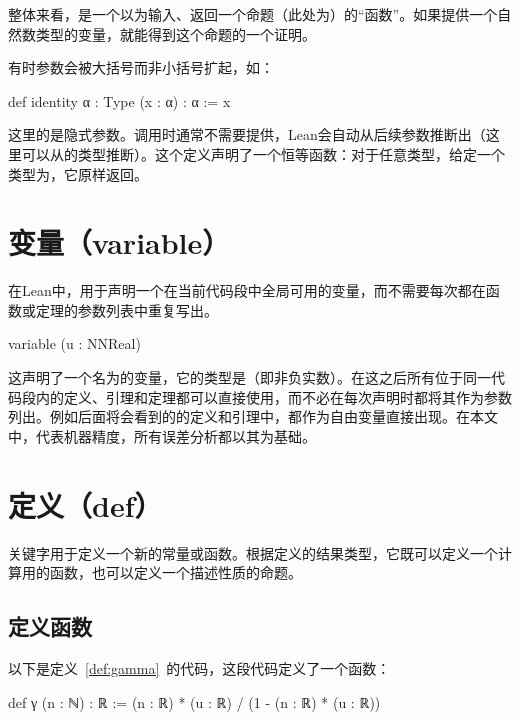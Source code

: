 ﻿\documentclass[UTF8,a4paper,openany]{ctexbook}
\theoremstyle{qrplain}
\begin{document}
整体来看，是一个以为输入、返回一个命题（此处为）的“函数”。如果提供一个自然数类型的变量，就能得到这个命题的一个证明。

有时参数会被大括号而非小括号扩起，如：

\begin{leancode}
  def identity {α : Type} (x : α) : α := x
\end{leancode}

这里的是隐式参数。调用时通常不需要提供，Lean会自动从后续参数推断出（这里可以从的类型推断）。这个定义声明了一个恒等函数：对于任意类型，给定一个类型为，它原样返回。

\section{变量（variable）}

在Lean中，用于声明一个在当前代码段中全局可用的变量，而不需要每次都在函数或定理的参数列表中重复写出。

\begin{leancode}
  variable (u : NNReal)
\end{leancode}

这声明了一个名为的变量，它的类型是（即非负实数）。在这之后所有位于同一代码段内的定义、引理和定理都可以直接使用，而不必在每次声明时都将其作为参数列出。例如后面将会看到的的定义和引理中，都作为自由变量直接出现。在本文中，代表机器精度，所有误差分析都以其为基础。

\section{定义（def）}

关键字用于定义一个新的常量或函数。根据定义的结果类型，它既可以定义一个计算用的函数，也可以定义一个描述性质的命题。

\subsection{定义函数}

以下是定义~\ref{def:gamma}~的代码，这段代码定义了一个函数：

\begin{leancode}
  def γ (n : ℕ) : ℝ := (n : ℝ) * (u : ℝ) / (1 - (n : ℝ) * (u : ℝ))
\end{leancode}
\end{document}
